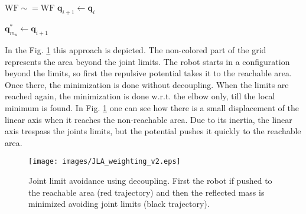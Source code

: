 \begin{algorithm}[H]
\begin{algorithmic}[1]
		
		

		
		\Else
		
		\State $\mathrm{WF \sim= WF }$ 
		\State $\mathbf{q}_{i+1} \leftarrow \mathbf{q}_i$
		
		\EndIf
		
		
		
		
		\EndIf
		
		\State $\mathbf{q}_{m_u}^\ast \leftarrow \mathbf{q}_{i+1}$ 
		
		\EndFor
	\end{algorithmic}
\end{algorithm}



  In the Fig. \ref{fig:wf_for_jla} this approach is depicted. The non-colored part of the grid represents the area beyond the joint limits. The robot starts in a configuration beyond the limits, so first the repulsive potential takes it to the reachable area. Once there, the minimization is done without decoupling. When the limits are reached again,  the minimization is done w.r.t. the elbow only, till the local minimum is found. In Fig. \ref{fig:wf_for_jla} one can see how there is a  small displacement of the linear axis when it reaches the non-reachable area. Due to its inertia, the linear axis trespass the joints limits, but the potential pushes it quickly to the reachable area.



\begin{figure}[!htb]
	\centerline{
		\texttt{[image: images/JLA\_weighting\_v2.eps]}}
	\caption{Joint limit avoidance using decoupling. First the robot if pushed to the reachable area (red trajectory) and then the reflected mass is minimized avoiding joint limits (black trajectory).}
	\label{fig:wf_for_jla}
\end{figure}




